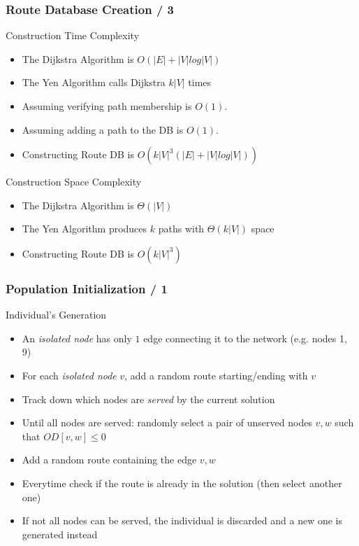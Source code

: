 \documentclass[dvipsnames]{beamer}
\begin{document}
\begin{frame}
  \frametitle{Route Database Creation / 3}
  \begin{alertblock}{Construction Time Complexity}
    \begin{itemize}
      \item The Dijkstra Algorithm is $O(|E|+|V|log|V|)$
      \item The Yen Algorithm calls Dijkstra $k|V|$ times
      \item Assuming verifying path membership is $O(1)$.
      \item Assuming adding a path to the DB is $O(1)$.
      \item Constructing Route DB is $O(k|V|^3(|E|+|V|log|V|))$
    \end{itemize}
  \end{alertblock}

  \begin{alertblock}{Construction Space Complexity}
    \begin{itemize}
      \item The Dijkstra Algorithm is $\Theta(|V|)$
      \item The Yen Algorithm produces $k$ paths with $\Theta(k|V|)$ space
      \item Constructing Route DB is $O(k|V|^3)$
    \end{itemize}
  \end{alertblock}
\end{frame}

\begin{frame}
  \frametitle{Population Initialization / 1}
  \begin{block}{Individual's Generation}
    \begin{itemize}
      \item An \textit{isolated node} has only $1$ edge connecting it to the network (e.g. nodes 1, 9)
      \item For each \textit{isolated node} $v$, add a random route starting/ending with $v$
      \item Track down which nodes are \textit{served} by the current solution
      \item Until all nodes are served: randomly select a pair of unserved nodes $v, w$ such that $OD[v, w] \leq 0$
      \item Add a random route containing the edge $v, w$
      \item Everytime check if the route is already in the solution (then select another one)
      \item If not all nodes can be served, the individual is discarded and a new one is generated instead
    \end{itemize}
  \end{block}
\end{frame}
\end{document}
